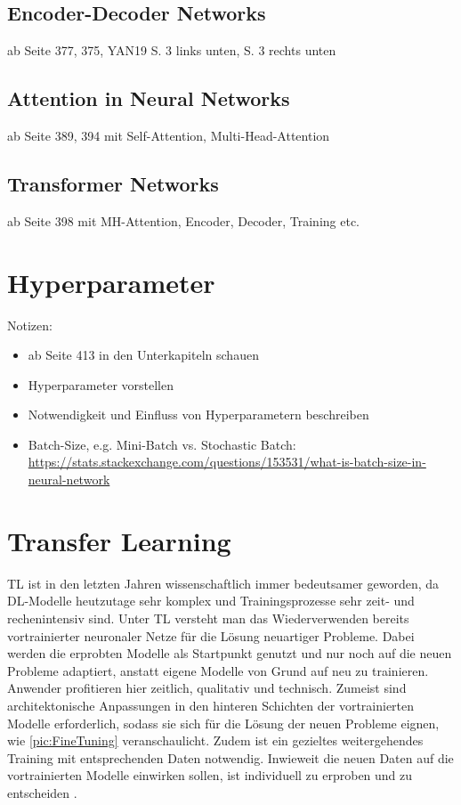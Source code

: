 \subsection{Encoder-Decoder Networks}
\cite{ZHA20} ab Seite 377, 375, YAN19 S. 3 links unten, S. 3 rechts unten


\subsection{Attention in Neural Networks}
\cite{ZHA20} ab Seite 389, 394 mit Self-Attention, Multi-Head-Attention


\subsection{Transformer Networks}
\cite{ZHA20} ab Seite 398 mit MH-Attention, Encoder, Decoder, Training etc.


\section{Hyperparameter}
Notizen:
\begin{itemize}
	\item \cite{ZHA20} ab Seite 413 in den Unterkapiteln schauen
	\item Hyperparameter vorstellen
	\item Notwendigkeit und Einfluss von Hyperparametern beschreiben
	\item Batch-Size, e.g. Mini-Batch vs. Stochastic Batch: \url{https://stats.stackexchange.com/questions/153531/what-is-batch-size-in-neural-network}
\end{itemize}


\section{Transfer Learning}
\ac{TL} ist in den letzten Jahren wissenschaftlich immer bedeutsamer geworden, da \ac{DL}-Modelle heutzutage sehr komplex und Trainingsprozesse sehr zeit- und rechenintensiv sind. Unter \ac{TL} versteht man das Wiederverwenden bereits vortrainierter neuronaler Netze für die Lösung neuartiger Probleme. Dabei werden die erprobten Modelle als Startpunkt genutzt und nur noch auf die neuen Probleme adaptiert, anstatt eigene Modelle von Grund auf neu zu trainieren. Anwender profitieren hier zeitlich, qualitativ und technisch. Zumeist sind architektonische Anpassungen in den hinteren Schichten der vortrainierten Modelle erforderlich, sodass sie sich für die Lösung der neuen Probleme eignen, wie \autoref{pic:FineTuning} veranschaulicht. Zudem ist ein gezieltes weitergehendes Training mit entsprechenden Daten notwendig. Inwieweit die neuen Daten auf die vortrainierten Modelle einwirken sollen, ist individuell zu erproben und zu entscheiden \cite[S.~554]{ZHA20}.

